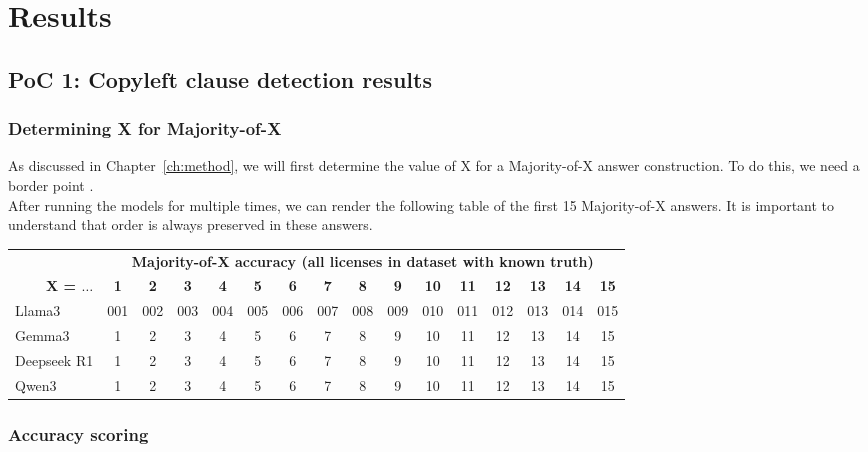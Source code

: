 
\chapter{Results}\label{ch:results}


\section{PoC 1: Copyleft clause detection results}

\subsection{Determining X for Majority-of-X}

As discussed in Chapter~\ref{ch:method}, we will first determine the value of X for a Majority-of-X answer construction. To do this, we need a border point . \\

After running the models for multiple times, we can render the following table of the first 15 Majority-of-X answers. It is important to understand that order is always preserved in these answers.

\begin{tabular}{|l|ccccccccccccccc|}
	\hline& \multicolumn{15}{|c|}{\textbf{Majority-of-X accuracy (all licenses in dataset with known truth)}} \\
	\multicolumn{1}{|r|}{\textbf{X = $\ldots$}} & \textbf{1} & \textbf{2} & \textbf{3} & \textbf{4} & \textbf{5} & \textbf{6} & \textbf{7} & \textbf{8} & \textbf{9} & \textbf{10} & \textbf{11} & \textbf{12} & \textbf{13} & \textbf{14} & \textbf{15} \\\hline
	Llama3 & 001 & 002 & 003 & 004 & 005 & 006 & 007 & 008 & 009 & 010 & 011 & 012 & 013 & 014 & 015 \\
	Gemma3 & 1 & 2 & 3 & 4 & 5 & 6 & 7 & 8 & 9 & 10 & 11 & 12 & 13 & 14 & 15 \\
	Deepseek R1 & 1 & 2 & 3 & 4 & 5 & 6 & 7 & 8 & 9 & 10 & 11 & 12 & 13 & 14 & 15 \\
	Qwen3 & 1 & 2 & 3 & 4 & 5 & 6 & 7 & 8 & 9 & 10 & 11 & 12 & 13 & 14 & 15 \\\hline
\end{tabular}

\subsection{Accuracy scoring}

